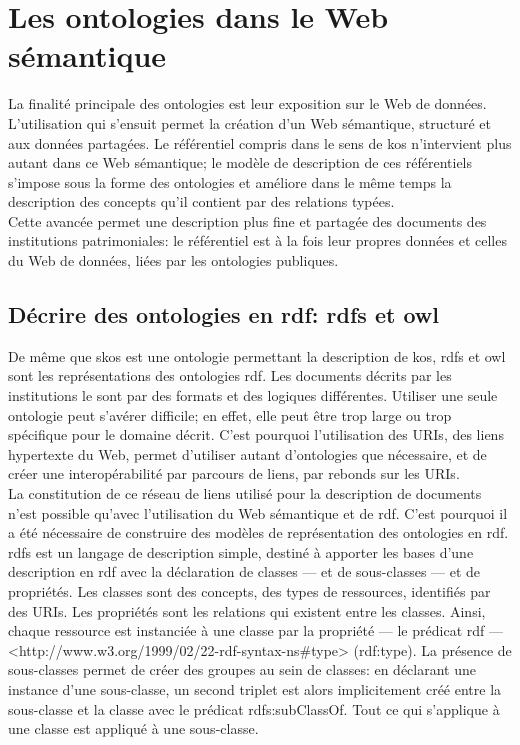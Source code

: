 \section{\label{II-B-3}Les ontologies dans le Web sémantique}

La finalité principale des ontologies est leur exposition sur le Web de données. L'utilisation qui s'ensuit permet la création d'un Web sémantique, structuré et aux données partagées. Le référentiel compris dans le sens de \ac{kos} n'intervient plus autant dans ce Web sémantique; le modèle de description de ces référentiels s'impose sous la forme des ontologies et améliore dans le même temps la description des concepts qu'il contient par des relations typées.\\

Cette avancée permet une description plus fine et partagée des documents des institutions patrimoniales: le référentiel est à la fois leur propres données et celles du Web de données, liées par les ontologies publiques.

\subsection{\label{II-B-3-a}Décrire des ontologies en \ac{rdf}: \ac{rdfs} et \ac{owl}}

De même que \ac{skos} est une ontologie permettant la description de \ac{kos}, \ac{rdfs} et \ac{owl} sont les représentations des ontologies \ac{rdf}. Les documents décrits par les institutions le sont par des formats et des logiques différentes. Utiliser une seule ontologie peut s'avérer difficile; en effet, elle peut être trop large ou trop spécifique pour le domaine décrit. C'est pourquoi l'utilisation des URIs, des liens hypertexte du Web, permet d'utiliser autant d'ontologies que nécessaire, et de créer une interopérabilité par parcours de liens, par rebonds sur les URIs.\\

La constitution de ce réseau de liens utilisé pour la description de documents n'est possible qu'avec l'utilisation du Web sémantique et de \ac{rdf}. C'est pourquoi il a été nécessaire de construire des modèles de représentation des ontologies en \ac{rdf}.\\

\ac{rdfs} est un langage de description simple, destiné à apporter les bases d'une description en \ac{rdf} avec la déclaration de classes --- et de sous-classes --- et de propriétés. Les classes sont des concepts, des types de ressources, identifiés par des URIs. Les propriétés sont les relations qui existent entre les classes. Ainsi, chaque ressource est instanciée à une classe par la propriété --- le prédicat \ac{rdf} --- <http://www.w3.org/1999/02/22-rdf-syntax-ns\#type> (rdf:type). La présence de sous-classes permet de créer des groupes au sein de classes: en déclarant une instance d'une sous-classe, un second triplet est alors implicitement créé entre la sous-classe et la classe avec le prédicat rdfs:subClassOf. Tout ce qui s'applique à une classe est appliqué à une sous-classe.\\

